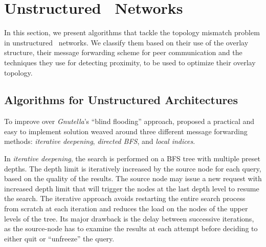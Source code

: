 \section{Unstructured \p\ Networks}
\label{section:unstructured}

In this section, we present algorithms that tackle the topology mismatch
problem in unstructured \p\ networks. We classify them based on their
use of the overlay structure, their message forwarding scheme 
for peer communication and the techniques they use for detecting
proximity, to be used to optimize their overlay topology.

\subsection{Algorithms for Unstructured Architectures}





To improve over {\sl Gnutella}'s ``blind flooding'' approach,
\cite{YG-M2002} proposed a practical and easy to implement solution 
weaved around three different message forwarding methods:
\emph{iterative deepening},
\emph{directed BFS}, and \emph{local indices}.

In \emph{iterative deepening}, 
the search is
performed on a BFS tree with multiple preset depths. 
The depth limit is iteratively increased by the source node for each query, 
based on the quality of the results. 
The source node may issue a new request with increased depth limit
that will trigger the nodes at the last depth level to resume the search. 
The iterative approach avoids restarting the entire search process 
from scratch at each iteration and reduces the load on the nodes of 
the upper levels of the tree. 
Its major drawback is the delay between successive iterations, as the
source-node has to examine the results at each attempt before deciding to
either quit or ``unfreeze'' the query.

